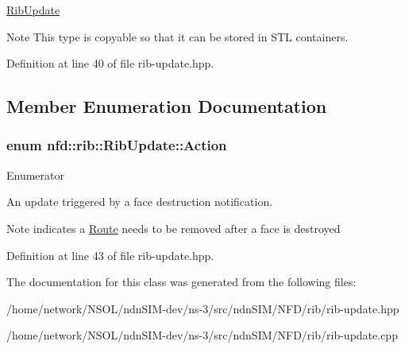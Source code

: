 \hyperlink{classnfd_1_1rib_1_1RibUpdate}{Rib\+Update} \begin{DoxyNote}{Note}
This type is copyable so that it can be stored in S\+TL containers. 
\end{DoxyNote}


Definition at line 40 of file rib-\/update.\+hpp.



\subsection{Member Enumeration Documentation}
\subsubsection[{\texorpdfstring{Action}{Action}}]{\setlength{\rightskip}{0pt plus 5cm}enum {\bf nfd\+::rib\+::\+Rib\+Update\+::\+Action}}\hypertarget{classnfd_1_1rib_1_1RibUpdate_aab70f45176a2e455a92b555dba35b91e}{}\label{classnfd_1_1rib_1_1RibUpdate_aab70f45176a2e455a92b555dba35b91e}
\begin{Desc}
\item[Enumerator]\par
\begin{description}
\item[{\em 
R\+E\+M\+O\+V\+E\+\_\+\+F\+A\+CE\hypertarget{classnfd_1_1rib_1_1RibUpdate_aab70f45176a2e455a92b555dba35b91eae2772cc285a7b66f79fdb6cfa4fd4282}{}\label{classnfd_1_1rib_1_1RibUpdate_aab70f45176a2e455a92b555dba35b91eae2772cc285a7b66f79fdb6cfa4fd4282}
}]An update triggered by a face destruction notification. \begin{DoxyNote}{Note}
indicates a \hyperlink{classnfd_1_1rib_1_1Route}{Route} needs to be removed after a face is destroyed 
\end{DoxyNote}
\end{description}
\end{Desc}


Definition at line 43 of file rib-\/update.\+hpp.



The documentation for this class was generated from the following files\+:\begin{DoxyCompactItemize}
\item 
/home/network/\+N\+S\+O\+L/ndn\+S\+I\+M-\/dev/ns-\/3/src/ndn\+S\+I\+M/\+N\+F\+D/rib/rib-\/update.\+hpp\item 
/home/network/\+N\+S\+O\+L/ndn\+S\+I\+M-\/dev/ns-\/3/src/ndn\+S\+I\+M/\+N\+F\+D/rib/rib-\/update.\+cpp\end{DoxyCompactItemize}
